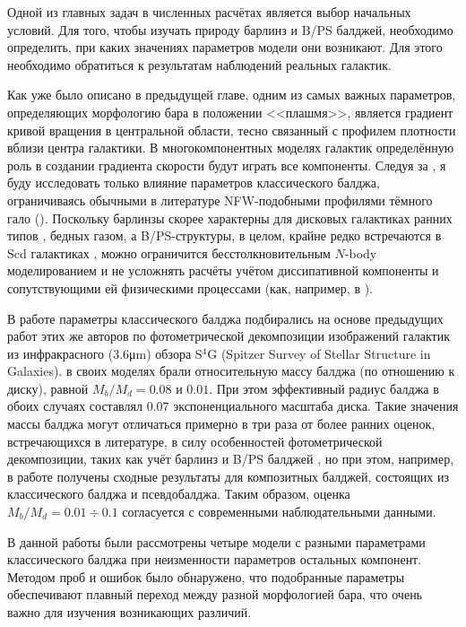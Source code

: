 \documentclass{trlnotes}
\begin{document}
Одной из главных задач в численных расчётах является выбор начальных условий. Для того, чтобы изучать природу барлинз и B/PS балджей, необходимо определить, при каких значениях параметров модели они возникают. Для этого необходимо обратиться к результатам наблюдений реальных галактик.

Как уже было описано в предыдущей главе, одним из самых важных параметров, определяющих морфологию бара в положении <<плашмя>>,
является градиент кривой вращения в центральной области, тесно связанный с профилем плотности вблизи центра галактики. В многокомпонентных моделях галактик определённую роль в создании градиента скорости будут играть все компоненты. Следуя за \citet{salo2017}, я буду исследовать только влияние параметров классического балджа, ограничиваясь обычными в литературе NFW-подобными профилями тёмного гало (\cite{navarro1996}). Поскольку барлинзы скорее характерны для дисковых галактиках ранних типов \citep{laurikainen2011}, бедных газом, а B/PS-структуры, в целом, крайне редко встречаются в Scd галактиках \citep{erwin2017, li2017a}, можно ограничится бесстолкновительным $N$-body моделированием и не усложнять расчёты учётом 
диссипативной компоненты и сопутствующими ей физическими процессами (как, например, в \cite{athanassoula2015}). 

В работе \citet{salo2017} параметры классического балджа подбирались на основе предыдущих работ этих же авторов по 
фотометрической декомпозиции изображений галактик из инфракрасного (3.6\thinspace μm) обзора S${}^4$G (Spitzer Survey of 
Stellar Structure in Galaxies). \citet{salo2015} в своих моделях брали относительную массу балджа (по отношению к диску), равной  
$M_b/M_d = 0.08$ и $0.01$. При этом эффективный радиус балджа в обоих случаях составлял $0.07$ экспоненциального 
масштаба диска. Такие значения массы балджа могут отличаться примерно в три раза от более ранних оценок, 
встречающихся в литературе, в силу особенностей фотометрической декомпозиции, таких как учёт барлинз и B/PS 
балджей \citep{laurikainen2016a}, но при этом, например, в работе \citet{erwin2015} получены сходные результаты для 
композитных балджей, состоящих из классического балджа и псевдобалджа. Таким образом, оценка $M_b/M_d = 0.01 \div 
0.1$ согласуется с современными наблюдательными данными.

В данной работы были рассмотрены четыре модели с разными параметрами классического балджа при неизменности параметров остальных компонент.  Методом проб и ошибок было обнаружено, что подобранные параметры обеспечивают плавный переход между разной морфологией бара, что очень важно для изучения возникающих различий. 
\end{document}
